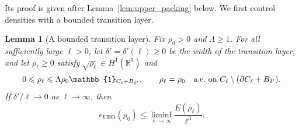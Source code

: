 \documentclass[final,reqno]{amsart}
\newtheorem{lemma}[theorem]{Lemma}
\theoremstyle{remark}
\theoremstyle{definition}
\renewcommand{\le}{\leqslant}
\renewcommand{\ge}{\geqslant}
\newcommand{\RR}{\mathbb{R}}
\newcommand{\iden}{\mathbb{1}}
\newcommand{\UEG}{\mathrm{UEG}}
\begin{document}
Its proof is given after Lemma~\ref{lem:upper_packing} below. We first control densities with a bounded transition layer.

\begin{lemma}[A bounded transition layer]\label{lem:upper_bounded_layer}
Fix $\rho_0>0$ and $\Lambda\ge1$. For all sufficiently large $\ell>0$, let $\delta'=\delta'(\ell)\ge0$ be the width of the transition layer, and let $\rho_\ell\ge 0$ satisfy $\sqrt{\rho_\ell}\in H^1(\RR^3)$ and
\[
0\le\rho_\ell\le \Lambda\rho_0\iden_{C_\ell+B_{\delta'}},
\qquad
\rho_\ell=\rho_0\quad\hbox{a.e.\ on }C_\ell\setminus(\partial C_\ell+B_{\delta'}).
\]
If $\delta'/\ell\to0$ as $\ell\to\infty$, then
\begin{equation}\label{eq:upper_bounded_layer}
e_\UEG(\rho_0)\le \liminf_{\ell\to\infty}\frac{E(\rho_\ell)}{\ell^3}.
\end{equation}
\end{lemma}
\end{document}
